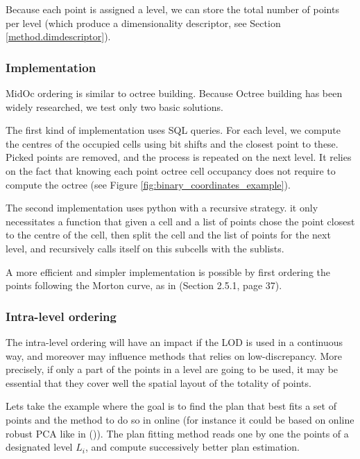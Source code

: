 		Because each point is assigned a level, we can store the total number of points per level (which produce a dimensionality descriptor, see Section \ref{method.dimdescriptor}).
		
		\subsubsection{Implementation}
		MidOc ordering is similar to octree building. Because Octree building has been widely researched, we test only two basic solutions.
		
		The first kind of implementation uses SQL queries. For each level, we compute the centres of the occupied cells using bit shifts and the closest point to these. Picked points are removed, and the process is repeated on the next level.
		It relies on the fact that knowing each point octree cell occupancy does not require to compute the octree (see Figure \ref{fig:binary_coordinates_example}).
		
		The second implementation uses python with a recursive strategy. it only necessitates a function that given a cell and a list of points chose the point closest to the centre of the cell, then split the cell and the list of points for the next level, and recursively calls itself on this subcells with the sublists.
		
		A more efficient and simpler implementation is possible by first ordering the points following the Morton curve, as  in \cite{Feng2014} (Section 2.5.1, page 37). 
		
		\subsubsection{Intra-level ordering}
		\label{method.intralevel}
		
		
		The intra-level ordering will have an impact if the LOD is used in a continuous way,
		and moreover may influence methods that relies on low-discrepancy.
		More precisely, if only a part of the points in a level are going to be used,
		it may be essential that they cover well the spatial layout of the totality of points.
		
		Lets take the example where the goal is to find the plan that best fits a set of points
		and the method to do so in online (for instance it could be based on online robust PCA like in (\cite{Feng2013})).
		The plan fitting method reads one by one the points of a designated level $L_i$, and compute successively better plan estimation.
		
